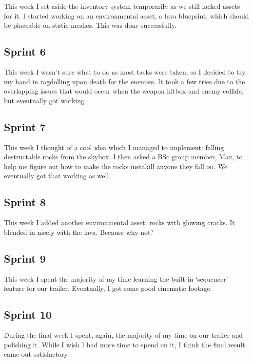 \documentclass{scrartcl}
\begin{document}
This week I set aside the inventory system temporarily as we still lacked assets for it. I started working on an environmental asset, a lava blueprint, which should be placeable on static meshes. This was done successfully. 

\subsection*{Sprint 6}

This week I wasn't sure what to do as most tasks were taken, so I decided to try my hand in ragdolling upon death for the enemies. It took a few tries due to the overlapping issues that would occur when the weapon hitbox and enemy collide, but eventually got working.

\subsection*{Sprint 7}

This week I thought of a cool idea which I managed to implement: falling destructable rocks from the skybox. I then asked a BSc group member, Max, to help me figure out how to make the rocks instakill anyone they fall on. We eventually got that working as well.

\subsection*{Sprint 8}

This week I added another environmental asset: rocks with glowing cracks. It blended in nicely with the lava. Because why not?

\subsection*{Sprint 9}

This week I spent the majority of my time learning the built-in `sequencer' feature for our trailer. Eventually, I got some good cinematic footage.  

\subsection*{Sprint 10}

During the final week I spent, again, the majority of my time on our trailer and polishing it. While I wish I had more time to spend on it, I think the final result came out satisfactory. 
\end{document}
